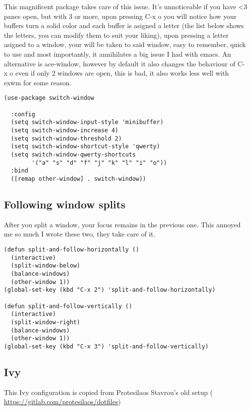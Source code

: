 \documentclass[12pt]{article}
\begin{document}
This magnificent package takes care of this issue. It’s unnoticeable if you have <3 panes open, but with 3 or more, upon pressing C-x o you will notice how your buffers turn a solid color and each buffer is asigned a letter (the list below shows the letters, you can modify them to suit your liking), upon pressing a letter asigned to a window, your will be taken to said window, easy to remember, quick to use and most importantly, it annihilates a big issue I had with emacs. An alternative is ace-window, however by default it also changes the behaviour of C-x o even if only 2 windows are open, this is bad, it also works less well with exwm for some reason.
\begin{verbatim}
(use-package switch-window

  :config
  (setq switch-window-input-style 'minibuffer)
  (setq switch-window-increase 4)
  (setq switch-window-threshold 2)
  (setq switch-window-shortcut-style 'qwerty)
  (setq switch-window-qwerty-shortcuts
        '("a" "s" "d" "f" "j" "k" "l" "i" "o"))
  :bind
  ([remap other-window] . switch-window))
\end{verbatim}

\subsection{Following window splits}
\label{sec:org30239cd}

After you split a window, your focus remains in the previous one. This annoyed me so much I wrote these two, they take care of it.
\begin{verbatim}
(defun split-and-follow-horizontally ()
  (interactive)
  (split-window-below)
  (balance-windows)
  (other-window 1))
(global-set-key (kbd "C-x 2") 'split-and-follow-horizontally)

(defun split-and-follow-vertically ()
  (interactive)
  (split-window-right)
  (balance-windows)
  (other-window 1))
(global-set-key (kbd "C-x 3") 'split-and-follow-vertically)

\end{verbatim}


\subsection{Ivy}
\label{sec:orgaa74583}

This Ivy configuration is copied from Protesilaos Stavrou's old setup ( \url{https://gitlab.com/protesilaos/dotfiles}) 
\end{document}

